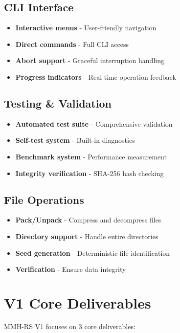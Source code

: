 \documentclass[11pt,a4paper]{article}
\begin{document}
	\subsection{CLI Interface}
	\begin{itemize}
		\item \textbf{Interactive menus} - User-friendly navigation
		\item \textbf{Direct commands} - Full CLI access
		\item \textbf{Abort support} - Graceful interruption handling
		\item \textbf{Progress indicators} - Real-time operation feedback
	\end{itemize}

	\subsection{Testing \& Validation}
	\begin{itemize}
		\item \textbf{Automated test suite} - Comprehensive validation
		\item \textbf{Self-test system} - Built-in diagnostics
		\item \textbf{Benchmark system} - Performance measurement
		\item \textbf{Integrity verification} - SHA-256 hash checking
	\end{itemize}

	\subsection{File Operations}
	\begin{itemize}
		\item \textbf{Pack/Unpack} - Compress and decompress files
		\item \textbf{Directory support} - Handle entire directories
		\item \textbf{Seed generation} - Deterministic file identification
		\item \textbf{Verification} - Ensure data integrity
	\end{itemize}

	\section{V1 Core Deliverables}
	\label{sec:deliverables}

	MMH-RS V1 focuses on 3 core deliverables:
\end{document}
